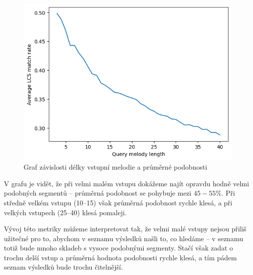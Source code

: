 \begin{figure}[!ht]
    \caption{Graf závislosti délky vstupní melodie a průměrné podobnosti}
    \centering
    \includegraphics[width=\textwidth]{images/lcs_match_rate.png}
\end{figure}

V grafu je vidět, že při velmi malém vstupu dokážeme najít opravdu hodně velmi podobných segmentů -- průměrná podobnost se pohybuje mezi $45-55 \%$. Při středně velkém vstupu (10--15) však průměrná podobnost rychle klesá, a při velkých vstupech (25--40) klesá pomaleji.

Vývoj této metriky můžeme interpretovat tak, že velmi malé vstupy nejsou přiliš užitečné pro to, abychom v seznamu výsledků našli to, co hledáme -- v seznamu totiž bude mnoho skladeb s vysoce podobnými segmenty. Stačí však zadat o trochu delší vstup a průměrná hodnota podobnosti rychle klesá, a tím pádem seznam výsledků bude trochu čitelnější. 